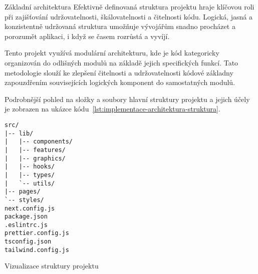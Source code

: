 \begin{subsection}{Základní architektura}
    \label{subsec:implementace-architektura-zakladni}
    Efektivně definovaná struktura projektu hraje klíčovou roli při zajišťování udržovatelnosti, škálovatelnosti a čitelnosti kódu.
    Logická, jasná a konzistentně udržovaná struktura umožňuje vývojářům snadno procházet a porozumět aplikaci, i když se  časem rozrůstá a vyvíjí.

    Tento projekt využívá modulární architekturu, kde je kód kategoricky organizován do odlišných modulů na základě jejich specifických funkcí.
    Tato metodologie slouží ke zlepšení čitelnosti a udržovatelnosti kódové základny zapouzdřením souvisejících logických komponent do samostatných modulů\cite{p_article_react_folder_structure}.

    Podrobnější pohled na složky a soubory hlavní struktury projektu a jejich účely je zobrazen na ukázce kódu~\ref{lst:implementace-architektura-struktura}.

    \begin{listing}[H]
        \begin{verbatim}
src/
|-- lib/
|   |-- components/
|   |-- features/
|   |-- graphics/
|   |-- hooks/
|   |-- types/
|   `-- utils/
|-- pages/
`-- styles/
next.config.js
package.json
.eslintrc.js
prettier.config.js
tsconfig.json
tailwind.config.js
        \end{verbatim}
        \caption{Vizualizace struktury projektu}
        \label{lst:implementace-architektura-struktura}
    \end{listing}


\end{subsection}
